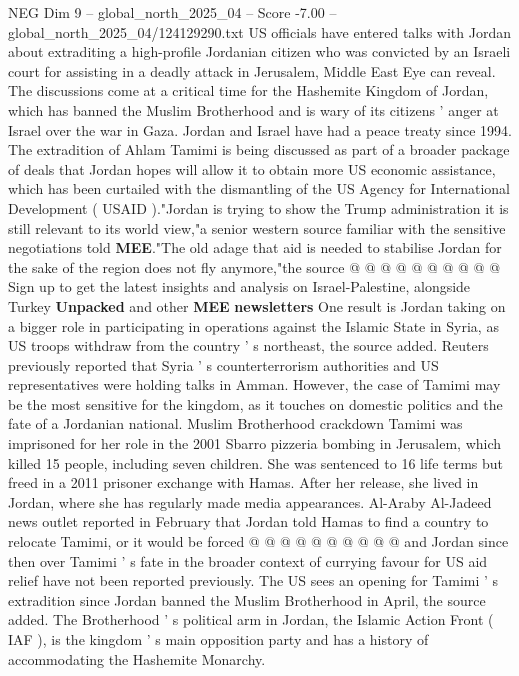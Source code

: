 \begin{textsample}{NEG Dim 9 – global\_north\_2025\_04 – Score -7.00 – global\_north\_2025\_04/124129290.txt}  \label{ex:f9_neg_028}
US officials have entered talks with Jordan about extraditing a high-profile Jordanian citizen who was convicted by an Israeli court for assisting in a deadly attack in Jerusalem, Middle East Eye can reveal.
The discussions come at a critical time for the Hashemite Kingdom of Jordan, which has banned the Muslim Brotherhood and is wary of its citizens ' anger at Israel over the war in Gaza.
Jordan and Israel have had a peace treaty since 1994.
The extradition of Ahlam Tamimi is being discussed as part of a broader package of deals that Jordan hopes will allow it to obtain more US economic assistance, which has been curtailed with the dismantling of the US Agency for International Development ( USAID )."Jordan is trying to show the Trump administration it is still relevant to its world view,"a senior western source familiar with the sensitive negotiations told \textbf{MEE}."The old adage that aid is needed to stabilise Jordan for the sake of the region does not fly anymore,"the source @ @ @ @ @ @ @ @ @ @ Sign up to get the latest insights and analysis on Israel-Palestine, alongside Turkey \textbf{Unpacked} and other \textbf{MEE} \textbf{newsletters} One result is Jordan taking on a bigger role in participating in operations against the Islamic State in Syria, as US troops withdraw from the country ' s northeast, the source added.
Reuters previously reported that Syria ' s counterterrorism authorities and US representatives were holding talks in Amman.
However, the case of Tamimi may be the most sensitive for the kingdom, as it touches on domestic politics and the fate of a Jordanian national.
Muslim Brotherhood crackdown Tamimi was imprisoned for her role in the 2001 Sbarro pizzeria bombing in Jerusalem, which killed 15 people, including seven children.
She was sentenced to 16 life terms but freed in a 2011 prisoner exchange with Hamas.
After her release, she lived in Jordan, where she has regularly made media appearances.
Al-Araby Al-Jadeed news outlet reported in February that Jordan told Hamas to find a country to relocate Tamimi, or it would be forced @ @ @ @ @ @ @ @ @ @ and Jordan since then over Tamimi ' s fate in the broader context of currying favour for US aid relief have not been reported previously.
The US sees an opening for Tamimi ' s extradition since Jordan banned the Muslim Brotherhood in April, the source added.
The Brotherhood ' s political arm in Jordan, the Islamic Action Front ( IAF ), is the kingdom ' s main opposition party and has a history of accommodating the Hashemite Monarchy.

\end{textsample}
